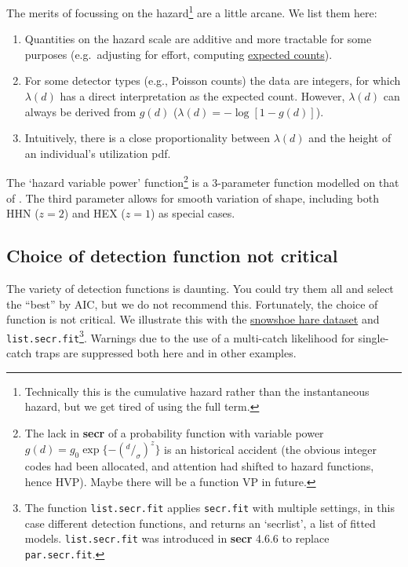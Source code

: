 \documentclass[
]{book}
\providecommand{\tightlist}{%
  \setlength{\itemsep}{0pt}\setlength{\parskip}{0pt}}
\begin{document}
The merits of focussing on the hazard\footnote{Technically this is the cumulative hazard rather than the instantaneous hazard, but we get tired of using the full term.} are a little arcane. We list them here:

\begin{enumerate}
\def\labelenumi{\arabic{enumi}.}
\tightlist
\item
  Quantities on the hazard scale are additive and more tractable for some purposes (e.g.~adjusting for effort, computing \hyperref[Expected]{expected counts}).
\item
  For some detector types (e.g., Poisson counts) the data are integers, for which \(\lambda(d)\) has a direct interpretation as the expected count. However, \(\lambda(d)\) can always be derived from \(g(d)\) (\(\lambda(d) = -\log[1 - g(d)]\)).
\item
  Intuitively, there is a close proportionality between \(\lambda(d)\) and the height of an individual's utilization pdf.
\end{enumerate}

The `hazard variable power' function\footnote{The lack in \textbf{secr} of a probability function with variable power \(g(d) = g_0 \exp \{ -(^d/_\sigma)^{z} \}\) is an historical accident (the obvious integer codes had been allocated, and attention had shifted to hazard functions, hence HVP). Maybe there will be a function VP in future.} is a 3-parameter function modelled on that of \citet{Ergon2013}. The third parameter allows for smooth variation of shape, including both HHN (\(z = 2\)) and HEX (\(z = 1\)) as special cases.

\subsection{Choice of detection function not critical}\label{choice-of-detection-function-not-critical}

The variety of detection functions is daunting. You could try them all and select the ``best'' by AIC, but we do not recommend this. Fortunately, the choice of function is not critical. We illustrate this with the \hyperref[Example]{snowshoe hare dataset} and \texttt{list.secr.fit}\footnote{The function \texttt{list.secr.fit} applies \texttt{secr.fit} with multiple settings, in this case different detection functions, and returns an `secrlist', a list of fitted models. \texttt{list.secr.fit} was introduced in \textbf{secr} 4.6.6 to replace \texttt{par.secr.fit}.}. Warnings due to the use of a multi-catch likelihood for single-catch traps are suppressed both here and in other examples.
\end{document}
